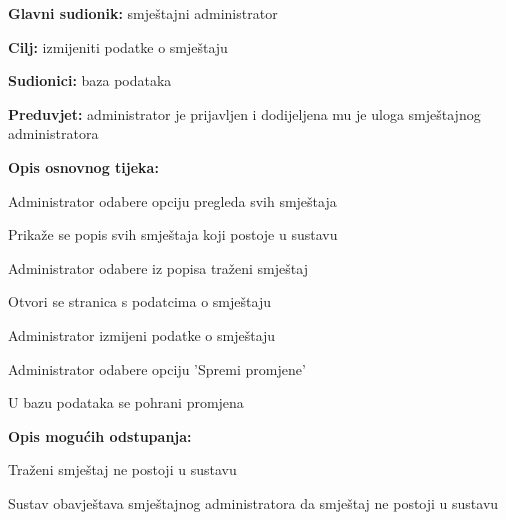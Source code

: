                         \noindent {}
					\begin{packed_item}
	
						\item \textbf{Glavni sudionik: }smještajni administrator
						\item  \textbf{Cilj:} izmijeniti podatke o smještaju
						\item  \textbf{Sudionici:} baza podataka
						\item  \textbf{Preduvjet:} administrator je prijavljen i dodijeljena mu je uloga smještajnog administratora
						\item  \textbf{Opis osnovnog tijeka:}
						
						\item[] \begin{packed_enum}
	
							\item Administrator odabere opciju pregleda svih smještaja
							\item Prikaže se popis svih smještaja koji postoje u sustavu
							\item Administrator odabere iz popisa traženi smještaj 
							\item Otvori se stranica s podatcima o smještaju
							\item Administrator izmijeni podatke o smještaju
                                \item Administrator odabere opciju 'Spremi promjene'
                                \item U bazu podataka se pohrani promjena
						\end{packed_enum}
						
						\item  \textbf{Opis mogućih odstupanja:}
						
						\item[] \begin{packed_item}
	
							\item[3.a] Traženi smještaj ne postoji u sustavu
							\item[] \begin{packed_enum}
								
								\item Sustav obavještava smještajnog administratora da smještaj ne postoji u sustavu
								
							\end{packed_enum}
							
						\end{packed_item}
					\end{packed_item}

